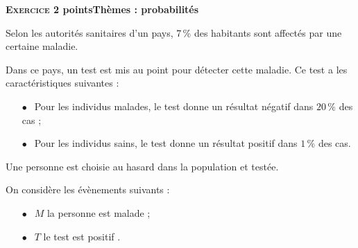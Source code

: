 \documentclass[10pt,a4paper]{article}
\begin{document}
\bigskip

\textbf{\textsc{Exercice 2}   points\hfill Thèmes : probabilités}

\medskip


Selon les autorités sanitaires d'un pays, 7\,\% des habitants sont affectés par une certaine maladie.

Dans ce pays, un test est mis au point pour détecter cette maladie. Ce test a les caractéristiques suivantes :
\setlength\parindent{1cm}
\begin{itemize}
\item[$\bullet~~$] Pour les individus malades, le test donne un résultat négatif dans $20 \,\%$ des cas ;
\item[$\bullet~~$] Pour les individus sains, le test donne un résultat positif dans $1\,\%$ des cas.
\end{itemize}
\setlength\parindent{0cm}

Une personne est choisie au hasard dans la population et testée.

On considère les évènements suivants :

\setlength\parindent{1cm}
\begin{itemize}
\item[$\bullet~~$] $M$ \og la personne est malade \fg{} ;
\item[$\bullet~~$]  $T$ \og le test est positif \fg{}.
\end{itemize}
\setlength\parindent{0cm}

\medskip
\end{document}
